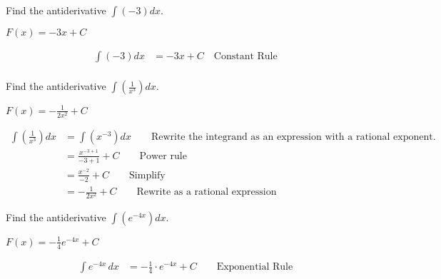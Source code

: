 \begin{example}
Find the antiderivative $\displaystyle\int (-3) dx$. 
    \begin{sol}
     $F(x)=-3x+C$ 
    \end{sol}
    \begin{solL}
    \begin{displaymath}
        \begin{split}
            \int (-3) dx&=-3x+C \quad \text{Constant Rule} \\
        \end{split}
    \end{displaymath}
    
    \end{solL}
    
\end{example}
\begin{example}
Find the antiderivative $\displaystyle\int \left(\frac{1}{x^3}\right) dx$. 
    \begin{sol}
     $F(x)=-\displaystyle\frac{1}{2x^2}+C$ 
    \end{sol}
    \begin{solL}
    \begin{displaymath}
        \begin{split}
            \int \left(\frac{1}{x^3}\right) dx&=\int \left(x^{-3}\right) dx \qquad \text{Rewrite the integrand as an expression with a rational exponent.} \\
            &=\frac{x^{-3+1}}{-3+1}+C \qquad  \text{Power rule}\\
            &=\frac{x^{-2}}{-2}+C \qquad  \text{Simplify}\\
            &=-\frac{1}{2x^2}+C \qquad \text{Rewrite as a rational expression}
        \end{split}
    \end{displaymath}
    
    \end{solL}
    
\end{example}
\begin{example}
Find the antiderivative $\displaystyle\int \left(e^{-4x}\right) dx$. 
    \begin{sol}
     $F(x)=-\displaystyle\frac{1}{4}e^{-4x}+C$ 
    \end{sol}
    \begin{solL}
    \begin{displaymath}
        \begin{split}
            \int e^{-4x}\,dx&=-\frac{1}{4}\cdot e^{-4x}+C \qquad \text{Exponential Rule}\\
        \end{split}
    \end{displaymath}
    
    \end{solL}
    
\end{example}
